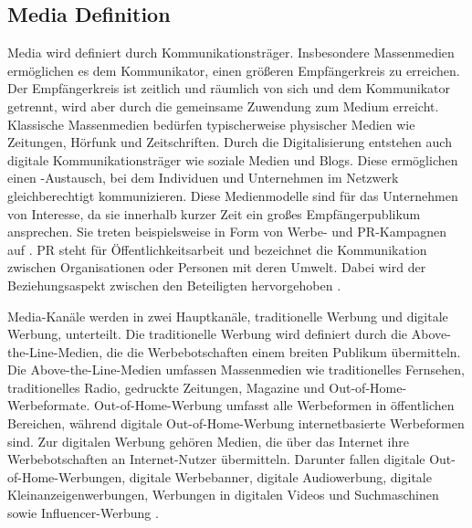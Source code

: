 \subsection{Media Definition}
\label{Media-KanäleDefinition}
Media wird definiert durch Kommunikationsträger. Insbesondere Massenmedien ermöglichen es dem Kommunikator, einen größeren Empfängerkreis zu erreichen. Der Empfängerkreis ist zeitlich und räumlich von sich und dem Kommunikator getrennt, wird aber durch die gemeinsame Zuwendung zum Medium erreicht. Klassische Massenmedien bedürfen typischerweise physischer Medien wie Zeitungen, Hörfunk und Zeitschriften. Durch die Digitalisierung entstehen auch digitale Kommunikationsträger wie soziale Medien und Blogs. Diese ermöglichen einen -Austausch, bei dem Individuen und Unternehmen im Netzwerk gleichberechtigt kommunizieren. Diese Medienmodelle sind für das Unternehmen von Interesse, da sie innerhalb kurzer Zeit ein großes Empfängerpublikum ansprechen. Sie treten beispielsweise in Form von Werbe- und \ac{PR}-Kampagnen auf \cite{Kleinjohann2024}. \ac{PR} steht für Öffentlichkeitsarbeit und bezeichnet die Kommunikation zwischen Organisationen oder Personen mit deren Umwelt. Dabei wird der Beziehungsaspekt zwischen den Beteiligten hervorgehoben \cite{Büsching2014}. \par
Media-Kanäle werden in zwei Hauptkanäle, traditionelle Werbung und digitale Werbung, unterteilt. Die traditionelle Werbung wird definiert durch die Above-the-Line-Medien, die die Werbebotschaften einem breiten Publikum übermitteln. Die Above-the-Line-Medien umfassen Massenmedien wie traditionelles Fernsehen, traditionelles Radio, gedruckte Zeitungen, Magazine und Out-of-Home-Werbeformate. Out-of-Home-Werbung umfasst alle Werbeformen in öffentlichen Bereichen, während digitale Out-of-Home-Werbung internetbasierte Werbeformen sind. Zur digitalen Werbung gehören Medien, die über das Internet ihre Werbebotschaften an Internet-Nutzer übermitteln. Darunter fallen digitale Out-of-Home-Werbungen, digitale Werbebanner, digitale Audiowerbung, digitale Kleinanzeigenwerbungen, Werbungen in digitalen Videos und Suchmaschinen sowie Influencer-Werbung \cite{statista_werbung}. 
